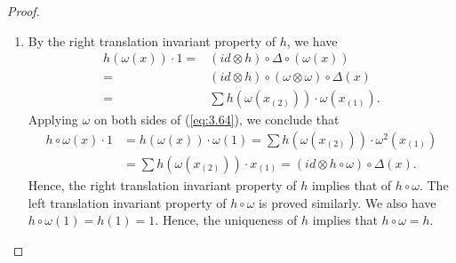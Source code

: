 \documentclass[table,a4paper,reqno]{amsart}
\numberwithin{equation}{section}
\theoremstyle{definition}
\begin{document}
\begin{proof}
\begin{enumerate}
        which means that $h\circ\gamma$ possess the left translation invariant property. Similarly, the left translation invariant property of $h$ implies the right translation invariant property of $h\circ \gamma$. We also have $h\circ\gamma(1)=h(1)=1$. Hence, the uniqueness of $h$ implies that $h\circ\gamma=h$.
        \item[2] By the right translation invariant property of $h$, we have
        \begin{equation}\label{eq:3.64}
            \begin{split}
            h(\omega(x))\cdot 1=&(id\otimes h)\circ\Delta\circ(\omega(x))\\
            =&(id\otimes h)\circ(\omega\otimes\omega)\circ\Delta(x)\\
            =&\sum h(\omega(x_{(2)}))\cdot \omega(x_{(1)}).
            \end{split}
        \end{equation}
        Applying $\omega$ on both sides of (\ref{eq:3.64}), we conclude that
        \begin{equation}
            \begin{split}
                h\circ\omega(x)\cdot 1&=h(\omega(x))\cdot \omega(1)=\sum h(\omega(x_{(2)}))\cdot \omega^2(x_{(1)})\\
                &=\sum h(\omega(x_{(2)}))\cdot x_{(1)}=(id\otimes h\circ\omega)\circ\Delta(x).
            \end{split}
        \end{equation}
        Hence, the right translation invariant property of $h$ implies that of $h\circ\omega$. The left translation invariant property of $h\circ\omega$ is proved similarly. We also have $h\circ\omega(1)=h(1)=1$. Hence, the uniqueness of $h$ implies that $h\circ\omega=h$.
    \end{enumerate}
\end{proof}
\end{document}
